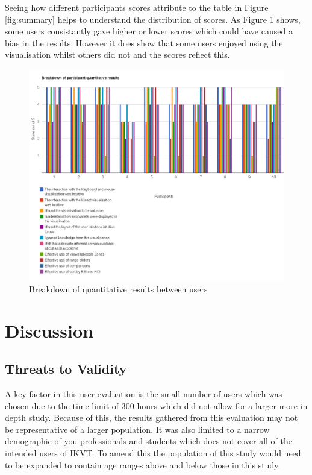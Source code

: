 Seeing how different participants scores attribute to the table in Figure
\ref{fig:summary} helps to understand the distribution of scores. As Figure
\ref{fig:breakdown} shows, some users consistantly gave higher or lower scores
which could have caused a bias in the results. However it does show that some
users enjoyed using the visualisation whilst others did not and the scores
reflect this. 
    
\begin{figure}[H]
  \includegraphics[width=1\textwidth]{images/breakdown.pdf}
  \caption{Breakdown of quantitative results between users}  
    \label{fig:breakdown}
\end{figure}

\section{Discussion}
\subsection{Threats to Validity}
A key factor in this user evaluation is the small number of users which was
chosen due to the time limit of 300 hours which did not allow for a larger more
in depth study. Because of this, the results gathered from this evaluation may
not be representative of a larger population. It was also limited to a narrow
demographic of you professionals and students which does not cover all of the
intended users of IKVT. To amend this the population of this study would need to
be expanded to contain age ranges above and below those in this study.

